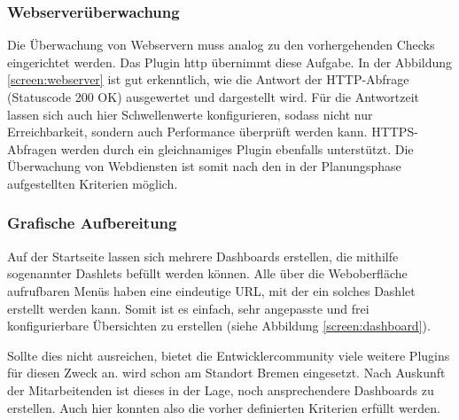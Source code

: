 \subsubsection{Webserverüberwachung}
\label{sec:ÜberwachungWebserver}
Die Überwachung von Webservern muss analog zu den vorhergehenden Checks eingerichtet werden. Das Plugin \glqq{}http\grqq{} übernimmt diese Aufgabe.  In der Abbildung \ref{screen:webserver} ist gut erkenntlich, wie die Antwort der HTTP-Abfrage (Statuscode 200 OK) ausgewertet und dargestellt wird. Für die Antwortzeit lassen sich auch hier Schwellenwerte konfigurieren, sodass nicht nur Erreichbarkeit, sondern auch Performance überprüft werden kann. HTTPS-Abfragen werden durch ein gleichnamiges Plugin ebenfalls unterstützt. Die Überwachung von Webdiensten ist somit nach den in der Planungsphase aufgestellten Kriterien möglich.

\subsubsection{Grafische Aufbereitung}
\label{sec:GrafischeAufbereitung}
Auf der Startseite lassen sich mehrere Dashboards erstellen, die mithilfe sogenannter \glqq{}Dashlets\grqq{} befüllt werden können. Alle über die Weboberfläche aufrufbaren Menüs haben eine eindeutige URL, mit der ein solches Dashlet erstellt werden kann. Somit ist es einfach, sehr angepasste  und frei konfigurierbare Übersichten zu erstellen (siehe Abbildung \ref{screen:dashboard}).

Sollte dies nicht ausreichen, bietet die Entwicklercommunity viele weitere Plugins für diesen Zweck an.  wird schon am Standort Bremen eingesetzt. Nach Auskunft der Mitarbeitenden ist dieses in der Lage, noch ansprechendere Dashboards zu erstellen. Auch hier konnten also die vorher definierten Kriterien erfüllt werden.